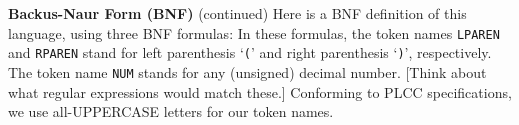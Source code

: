 \begin{minipage}[t]{\sw}
\slidenumber
\LARGE
{\bf Backus-Naur Form (BNF)} (continued)\exx
Here is a BNF definition of this language,
using three BNF formulas:\exx
\emm\NormalBox{\MYlon}\exx
In these formulas, the token names
\verb'LPAREN' and \verb'RPAREN' stand
for left parenthesis `\verb'(''
and right parenthesis `\verb')'', respectively.
The token name \verb'NUM' stands for any (unsigned) decimal number.
[Think about what regular expressions would match these.]
Conforming to PLCC specifications,
we use all-UPPERCASE letters for our token names.\exx
\end{minipage}
\clearpage
